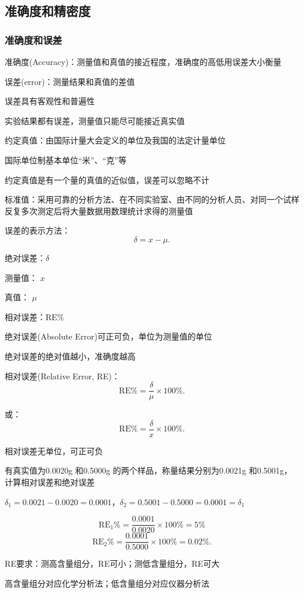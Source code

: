 \subsection{准确度和精密度}%
\label{sub:准确度和精密度}
\subsubsection{准确度和误差}%
\label{subsub:准确度和误差}
\begin{defi}
    准确度(Accuracy)：测量值和真值的接近程度，准确度的高低用误差大小衡量
\end{defi}
\begin{defi}
    误差(error)：测量结果和真值的差值
\end{defi}
误差具有客观性和普遍性

实验结果都有误差，测量值只能尽可能接近真实值
\begin{defi}
    约定真值：由国际计量大会定义的单位及我国的法定计量单位
    \begin{eg}
        国际单位制基本单位“米”、“克”等
    \end{eg}
    \begin{notation}
        约定真值是有一个量的真值的近似值，误差可以忽略不计
    \end{notation}
\end{defi}

\begin{defi}
    标准值：采用可靠的分析方法、在不同实验室、由不同的分析人员、对同一个试样反复多次测定后将大量数据用数理统计求得的测量值
\end{defi}
误差的表示方法：\[
    \delta=x-\mu
.\] 
\begin{defi}
    绝对误差：$\delta$

    测量值： $x$

    真值： $\mu$ 

    相对误差：$\text{RE}\%$
\end{defi}
绝对误差(Absolute Error)可正可负，单位为测量值的单位

绝对误差的绝对值越小，准确度越高

相对误差(Relative Error, RE)：\[
    \text{RE}\% = \frac{\delta}{\mu}\times 100\%
.\] 

或：\[
    \text{RE}\% = \frac{\delta}{x}\times 100\%
.\]

相对误差无单位，可正可负
\begin{eg}
    有真实值为0.0020g 和0.5000g 的两个样品，称量结果分别为0.0021g 和0.5001g，计算相对误差和绝对误差

$\delta_1=0.0021-0.0020=0.0001$，$\delta_2=0.5001-0.5000=0.0001=\delta_1$

\[
    \text{RE}_1\%=\frac{0.0001}{0.0020}\times 100\%=5\%
\]
\[
    \text{RE}_2\%=\frac{0.0001}{0.5000}\times 100\%=0.02\%
.\]  
\end{eg}
\begin{notation}
    RE要求：测高含量组分，RE可小；测低含量组分，RE可大

    高含量组分对应化学分析法；低含量组分对应仪器分析法
\end{notation}
